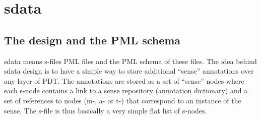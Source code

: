 \section{sdata}
\subsection{The design and the PML schema}
sdata means s-files PML files and the PML schema of these files. The idea behind sdata design is to have a simple way to store additional ``sense'' annotations over any layer of PDT. The annotations are stored as a set of ``sense'' nodes where each s-node contains a link to a sense repository (annotation dictionary) and a set of references to nodes (m-, a- or t-) that correspond to an instance of the sense. The s-file is thus basically a very simple flat list of s-nodes.
